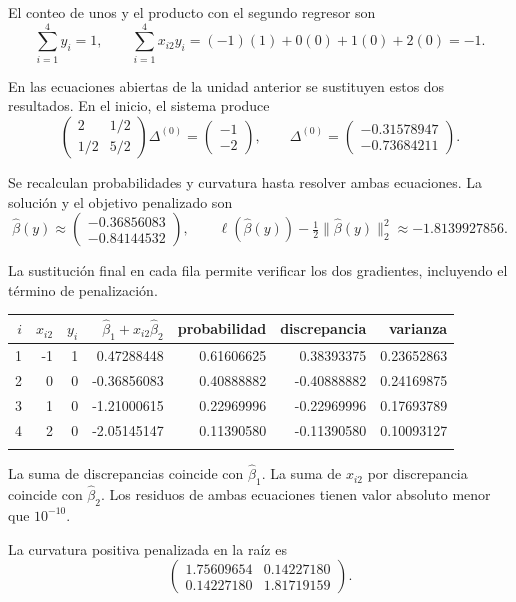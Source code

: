 \documentclass[11pt,a4paper]{article}
\begin{document}
El conteo de unos y el producto con el segundo regresor son
\[
\sum_{i=1}^4 y_i=1,\qquad\sum_{i=1}^4x_{i2}y_i=(-1)(1)+0(0)+1(0)+2(0)=-1.
\]

En las ecuaciones abiertas de la unidad anterior se sustituyen
estos dos resultados. En el inicio, el sistema produce
\[
\begin{pmatrix}2&1/2\\1/2&5/2\end{pmatrix}\Delta^{(0)}=\begin{pmatrix}-1\\-2\end{pmatrix},\qquad\Delta^{(0)}=\begin{pmatrix}-0.31578947\\-0.73684211\end{pmatrix}.
\]

Se recalculan probabilidades y curvatura hasta resolver
ambas ecuaciones. La solución y el objetivo penalizado son
\[
\widehat\beta(y)\approx\begin{pmatrix}-0.36856083\\-0.84144532\end{pmatrix},\qquad \ell(\widehat\beta(y))-\tfrac12\|\widehat\beta(y)\|_2^2\approx-1.8139927856.
\]

La sustitución final en cada fila permite verificar
los dos gradientes, incluyendo el término de penalización.
\begin{center}\scriptsize
\begin{tabular}{rrrrrrr}\toprule
\(i\)&\(x_{i2}\)&\(y_i\)&\(\widehat\beta_1+x_{i2}\widehat\beta_2\)&probabilidad&discrepancia&varianza\\\midrule
1&-1&1&0.47288448&0.61606625&0.38393375&0.23652863\\
2&0&0&-0.36856083&0.40888882&-0.40888882&0.24169875\\
3&1&0&-1.21000615&0.22969996&-0.22969996&0.17693789\\
4&2&0&-2.05145147&0.11390580&-0.11390580&0.10093127\\
\\\bottomrule\end{tabular}\end{center}
La suma de discrepancias coincide con \(\widehat\beta_1\).
La suma de \(x_{i2}\) por discrepancia coincide con
\(\widehat\beta_2\). Los residuos de ambas ecuaciones
tienen valor absoluto menor que \(10^{-10}\).

La curvatura positiva penalizada en la raíz es
\[
\begin{pmatrix}1.75609654&0.14227180\\0.14227180&1.81719159\end{pmatrix}.
\]
\end{document}
